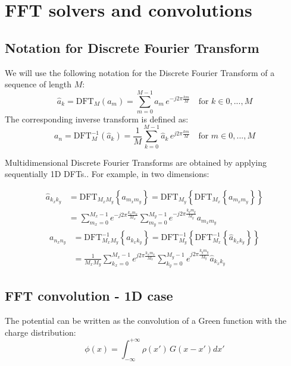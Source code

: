 \chapter{FFT solvers and convolutions}

\section{Notation for Discrete Fourier Transform}
We will use the following notation for the Discrete Fourier Transform of a sequence of length $M$:
\begin{equation}
\hat{a}_k = \text{DFT}_M(a_m) =  \sum_{m=0}^{M-1} a_m\, e^{-j2\pi  \frac{km}{M}}  \quad \text{for } k \in 0, ..., M
\end{equation}
The corresponding inverse transform is defined as:
\begin{equation}
{a}_n = \text{DFT}^{-1}_M(\hat{a}_k) =  \frac{1}{M}\sum_{k=0}^{M-1} \hat{a}_k\, e^{j2\pi  \frac{km}{M}}  \quad \text{for } m \in 0, ..., M
\end{equation}

Multidimensional Discrete Fourier Transforms are obtained by applying sequentially 1D DFTs.. For example, in two dimensions:

\begin{equation}
\begin{split}
\hat{a}_{k_xk_y} &= \text{DFT}_{M_xM_y}\left\{a_{m_xm_y}\right\}  
= \text{DFT}_{M_y} \left\{\text{DFT}_{M_x}\left\{a_{m_xm_y}\right\}\right\}\\  
&=\sum_{m_x=0}^{M_x-1} e^{-j 2\pi  \frac{k_x m_x}{M_x}} 
\sum_{m_y=0}^{M_y-1} e^{-j 2\pi  \frac{k_y m_y}{M_y}} a_{m_xm_y}
\end{split}
\end{equation}
\begin{equation}
\begin{split}
{a}_{n_xn_y} &= \text{DFT}^{-1}_{M_xM_y}\left\{a_{k_x k_y}\right\}  
= \text{DFT}^{-1}_{M_y} \left\{\text{DFT}^{-1}_{M_x}\left\{\hat{a}_{k_x k_y}\right\}\right\}\\  
&=\frac{1}{M_x M_y}\sum_{k_x=0}^{M_x-1} e^{j 2\pi  \frac{k_x m_x}{M_x}} 
\sum_{k_y=0}^{M_y-1} e^{j 2\pi  \frac{k_y m_y}{M_y}} \hat{a}_{k_xk_y}
\end{split}
\end{equation}

\section{FFT convolution - 1D case}
\label{sec:fftconv1d}
The potential can be written as the convolution of a Green function with the charge distribution:
\begin{equation}
\phi(x) = \int_{-\infty}^{+\infty} \rho(x')\,G(x-x') dx'
\label{eq:conv}
\end{equation}

